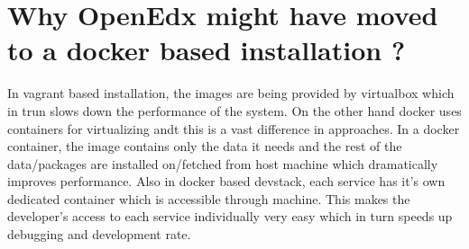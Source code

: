 \section{Why OpenEdx might have moved to a docker based installation ?}
In vagrant based installation, the images are being provided by virtualbox which in trun slows
down the performance of the system. On the other hand docker uses containers for
virtualizing andt this is a vast difference in approaches.\newline
In a docker container, the image contains only the data it needs and the rest of the
data/packages are installed on/fetched from host machine which dramatically improves
performance. Also in docker based devstack, each service has it’s own dedicated container
which is accessible through machine. This makes the developer’s access to each service
individually very easy which in turn speeds up debugging and development rate.\newline


